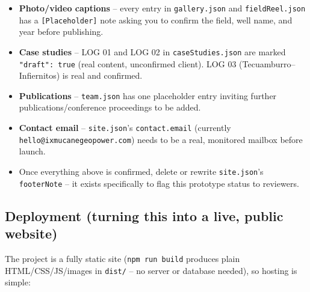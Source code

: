 \documentclass[11pt]{article}
\newcommand{\code}[1]{\texttt{\small #1}}
\newcommand{\file}[1]{\texttt{\small\color{ixaccent}#1}}
\begin{document}
\begin{itemize}[leftmargin=1.4em]
  \item \textbf{Photo/video captions} -- every entry in \file{gallery.json}
    and \file{fieldReel.json} has a \code{[Placeholder]} note asking you to
    confirm the field, well name, and year before publishing.
  \item \textbf{Case studies} -- LOG 01 and LOG 02 in \file{caseStudies.json}
    are marked \code{"draft": true} (real content, unconfirmed client). LOG
    03 (Tecuamburro--Infiernitos) is real and confirmed.
  \item \textbf{Publications} -- \file{team.json} has one placeholder entry
    inviting further publications/conference proceedings to be added.
  \item \textbf{Contact email} -- \file{site.json}'s
    \code{contact.email} (currently \code{hello@ixmucanegeopower.com}) needs
    to be a real, monitored mailbox before launch.
  \item Once everything above is confirmed, delete or rewrite
    \code{site.json}'s \code{footerNote} -- it exists specifically to flag
    this prototype status to reviewers.
\end{itemize}

\subsection{Deployment (turning this into a live, public website)}
The project is a fully static site (\code{npm run build} produces plain
HTML/CSS/JS/images in \file{dist/} -- no server or database needed), so
hosting is simple:
\end{document}
